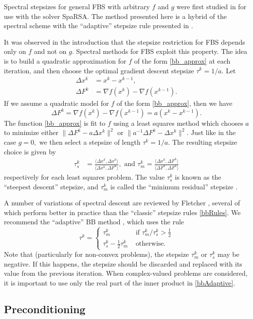 \documentclass{amsart}
\newcommand{\half}{\frac{1}{2}}
\newcommand{\eqn}[2]{\begin{equation}\label{#1}#2\end{equation}}
\newcommand{\aln}[1]{\begin{align}#1\end{align}}
\newcommand{\css}[1]{\begin{cases}#1\end{cases}}
\newcommand{\ra}{\rangle}
\newcommand{\la}{\langle}
\newcommand{\km}{^{k-1}}
\theoremstyle{definition}
\begin{document}
Spectral stepsizes for general FBS with arbitrary $f$ and $g$ were first studied in \cite{WNF09} for use with the solver SpaRSA.  The method presented here is a hybrid of the spectral scheme \cite{WNF09} with the ``adaptive'' stepsize rule presented in \cite{ZGD06}.

It was observed in the introduction that the stepsize restriction for FBS depends only on $f$ and not on $g.$  Spectral methods for FBS exploit this property.  The idea is to build a quadratic approximation for $f$ of the form \eqref{bb_approx} at each iteration, and then choose the optimal gradient descent stepsize  $\tau^k=1/a.$    Let 
  \aln{
  \Delta x^k &= x^k - x\km, \\
   \Delta F^k &= \nabla f (x^k) - \nabla f(x\km). 
  }
 If we assume a quadratic model for $f$ of the form \eqref{bb_approx}, then we have $$\Delta F^k= \nabla f(x^k) - \nabla f(x\km) = a(x^k - x\km).$$  The function \eqref{bb_approx} is fit to $f$ using a least squares method which chooses $a$ to minimize either $\| \Delta F^k - a \Delta x^k \|^2$ or $\| a^{-1}\Delta F^k -  \Delta x^k \|^2.$ Just like in the case $g=0,$ we then select a stepsize of length $\tau^k = 1/a$.  The resulting stepsize choice is given by  
  \aln{ \label{bbRules}
   \tau_s^k &=\frac{ \la   \Delta x^k, \Delta x^k \ra}{\la   \Delta x^k, \Delta F^k \ra},\text{ and }  \tau_m^k =\frac{\la   \Delta x^k, \Delta F^k \ra} { \la   \Delta F^k, \Delta F^k \ra}
   }  
respectively for each least squares problem.  The value $ \tau_s^k$ is known as the ``steepest descent'' stepsize, and  $ \tau_m^k$ is called the ``minimum residual'' stepsize \cite{ZGD06}.

A number of variations of spectral descent are reviewed by Fletcher \cite{Fletcher05}, several of which perform better in practice than the ``classic'' stepsize rules \eqref{bbRules}.  We recommend the ``adaptive'' BB method \cite{ZGD06},  which uses the rule
        \eqn{bbAdaptive}{ \tau^k=
    \css{
      \tau_m^k & \text{ if } \tau_m^k/\tau_s^k >\half \\
       \tau_s^k - \half  \tau_m^k & \text{ otherwise.}  
    }
    }
   Note that (particularly for non-convex problems), the stepsize $\tau_m^k$ or $\tau_s^k$ may be negative.  If this happens, the stepsize should be discarded and replaced with its value from the previous iteration.  When complex-valued problems are considered, it is important to use only the real part of the inner product in \eqref{bbAdaptive}.

\subsection{Preconditioning}
\end{document}
